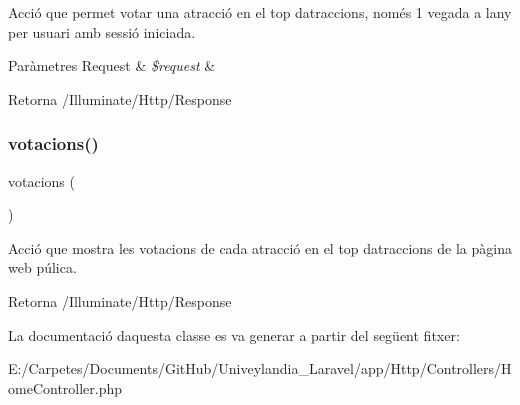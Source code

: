 Acció que permet votar una atracció en el top d\textquotesingle{}atraccions, només 1 vegada a l\textquotesingle{}any per usuari amb sessió iniciada.


\begin{DoxyParams}[1]{Paràmetres}
Request & {\em \$request} & \\
\hline
\end{DoxyParams}
\begin{DoxyReturn}{Retorna}
/\+Illuminate/\+Http/\+Response 
\end{DoxyReturn}
\mbox{\label{class_app_1_1_http_1_1_controllers_1_1_home_controller_a4fb75d6f81cb35e6c55993e6e650636c}} 
\subsubsection{\texorpdfstring{votacions()}{votacions()}}
{\footnotesize\ttfamily votacions (\begin{DoxyParamCaption}{ }\end{DoxyParamCaption})}

Acció que mostra les votacions de cada atracció en el top d\textquotesingle{}atraccions de la pàgina web púlica.

\begin{DoxyReturn}{Retorna}
/\+Illuminate/\+Http/\+Response 
\end{DoxyReturn}


La documentació d\textquotesingle{}aquesta classe es va generar a partir del següent fitxer\+:\begin{DoxyCompactItemize}
\item 
E\+:/\+Carpetes/\+Documents/\+Git\+Hub/\+Univeylandia\+\_\+\+Laravel/app/\+Http/\+Controllers/Home\+Controller.\+php\end{DoxyCompactItemize}
